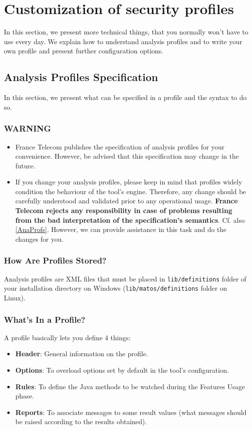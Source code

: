 \chapter{Customization of security profiles} \label{AdvancedUsage}

In this section, we present more technical things, that you normally
won't have to use every day. We explain how to understand analysis
profiles and to write your own profile and present further
configuration options.

\section{Analysis Profiles Specification}\label{ProfFormalization}
In this section, we present what can be specified in a profile and the
syntax to do so.

\subsection*{WARNING} 
\begin{itemize}
\item France Telecom publishes the specification of
  analysis profiles for your convenience. However, be advised that this
  specification may change in the future. 
\item If you change your analysis profiles, please keep in mind that
  profiles widely condition the behaviour of the tool's
  engine. Therefore, any change should be carefully understood and
  validated prior to any operational usage. \textbf{France Telecom rejects any
  responsibility in case of problems resulting from the bad
  interpretation of the specification's semantics}. Cf. also
  \ref{AnaProfs}. However, we can provide assistance in this task and
  do the changes for you.
\end{itemize}

\subsection{How Are Profiles Stored?}
Analysis profiles are XML files that must be placed in
\texttt{lib/definitions} folder of your installation directory on
Windows (\texttt{lib/matos/definitions} folder on Linux).

\subsection{What's In a Profile?}
A profile basically lets you define 4 things:
\begin{itemize}
\item \textbf{Header}: General information on the profile.
\item \textbf{Options}: To overload options set by default in the tool's
configuration.
\item \textbf{Rules}: To define the Java methods to be watched
during the Features Usage phase.
\item \textbf{Reports}: To associate messages to some result values (what messages
should be raised according to the results obtained).
\end{itemize}


